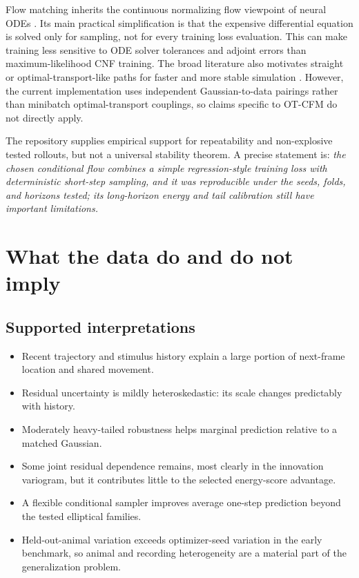 \documentclass[11pt]{article}
\begin{document}
Flow matching inherits the continuous normalizing flow viewpoint of neural ODEs \citep{chen2018neuralode}. Its main practical simplification is that the expensive differential equation is solved only for sampling, not for every training loss evaluation. This can make training less sensitive to ODE solver tolerances and adjoint errors than maximum-likelihood CNF training. The broad literature also motivates straight or optimal-transport-like paths for faster and more stable simulation \citep{liu2023rectified,tong2024otcfm}. However, the current implementation uses independent Gaussian-to-data pairings rather than minibatch optimal-transport couplings, so claims specific to OT-CFM do not directly apply.

The repository supplies empirical support for repeatability and non-explosive tested rollouts, but not a universal stability theorem. A precise statement is: \emph{the chosen conditional flow combines a simple regression-style training loss with deterministic short-step sampling, and it was reproducible under the seeds, folds, and horizons tested; its long-horizon energy and tail calibration still have important limitations.}

\section{What the data do and do not imply}

\subsection*{Supported interpretations}
\begin{itemize}
  \item Recent trajectory and stimulus history explain a large portion of next-frame location and shared movement.
  \item Residual uncertainty is mildly heteroskedastic: its scale changes predictably with history.
  \item Moderately heavy-tailed robustness helps marginal prediction relative to a matched Gaussian.
  \item Some joint residual dependence remains, most clearly in the innovation variogram, but it contributes little to the selected energy-score advantage.
  \item A flexible conditional sampler improves average one-step prediction beyond the tested elliptical families.
  \item Held-out-animal variation exceeds optimizer-seed variation in the early benchmark, so animal and recording heterogeneity are a material part of the generalization problem.
\end{itemize}
\end{document}
